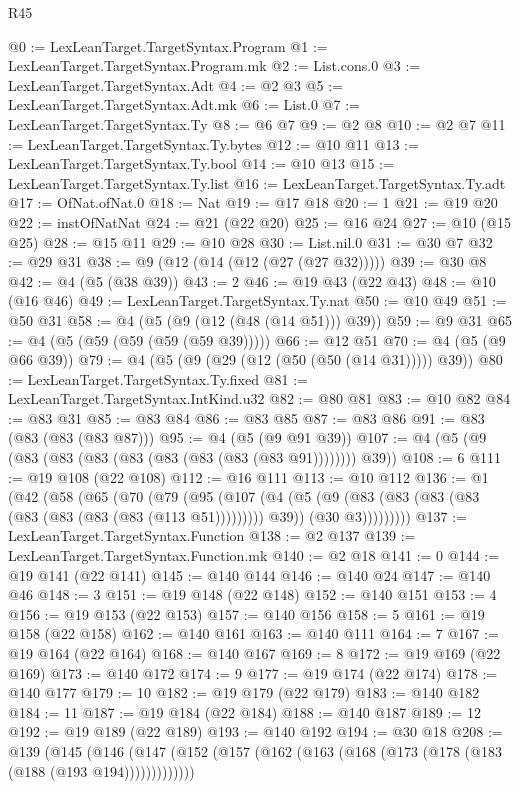 \begin{lexlean}{R45}
\begin{coremodule}
@0 := LexLeanTarget.TargetSyntax.Program
@1 := LexLeanTarget.TargetSyntax.Program.mk
@2 := List.cons.{0}
@3 := LexLeanTarget.TargetSyntax.Adt
@4 := @2 @3
@5 := LexLeanTarget.TargetSyntax.Adt.mk
@6 := List.{0}
@7 := LexLeanTarget.TargetSyntax.Ty
@8 := @6 @7
@9 := @2 @8
@10 := @2 @7
@11 := LexLeanTarget.TargetSyntax.Ty.bytes
@12 := @10 @11
@13 := LexLeanTarget.TargetSyntax.Ty.bool
@14 := @10 @13
@15 := LexLeanTarget.TargetSyntax.Ty.list
@16 := LexLeanTarget.TargetSyntax.Ty.adt
@17 := OfNat.ofNat.{0}
@18 := Nat
@19 := @17 @18
@20 := 1
@21 := @19 @20
@22 := instOfNatNat
@24 := @21 (@22 @20)
@25 := @16 @24
@27 := @10 (@15 @25)
@28 := @15 @11
@29 := @10 @28
@30 := List.nil.{0}
@31 := @30 @7
@32 := @29 @31
@38 := @9 (@12 (@14 (@12 (@27 (@27 @32)))))
@39 := @30 @8
@42 := @4 (@5 (@38 @39))
@43 := 2
@46 := @19 @43 (@22 @43)
@48 := @10 (@16 @46)
@49 := LexLeanTarget.TargetSyntax.Ty.nat
@50 := @10 @49
@51 := @50 @31
@58 := @4 (@5 (@9 (@12 (@48 (@14 @51))) @39))
@59 := @9 @31
@65 := @4 (@5 (@59 (@59 (@59 (@59 @39)))))
@66 := @12 @51
@70 := @4 (@5 (@9 @66 @39))
@79 := @4 (@5 (@9 (@29 (@12 (@50 (@50 (@14 @31))))) @39))
@80 := LexLeanTarget.TargetSyntax.Ty.fixed
@81 := LexLeanTarget.TargetSyntax.IntKind.u32
@82 := @80 @81
@83 := @10 @82
@84 := @83 @31
@85 := @83 @84
@86 := @83 @85
@87 := @83 @86
@91 := @83 (@83 (@83 (@83 @87)))
@95 := @4 (@5 (@9 @91 @39))
@107 := @4 (@5 (@9 (@83 (@83 (@83 (@83 (@83 (@83 (@83 (@83 @91)))))))) @39))
@108 := 6
@111 := @19 @108 (@22 @108)
@112 := @16 @111
@113 := @10 @112
@136 := @1
    (@42
      (@58
        (@65
          (@70
            (@79
              (@95
                (@107
                  (@4
                    (@5 (@9 (@83 (@83 (@83 (@83 (@83 (@83 (@83 (@83 (@113 @51))))))))) @39))
                    (@30 @3)))))))))
@137 := LexLeanTarget.TargetSyntax.Function
@138 := @2 @137
@139 := LexLeanTarget.TargetSyntax.Function.mk
@140 := @2 @18
@141 := 0
@144 := @19 @141 (@22 @141)
@145 := @140 @144
@146 := @140 @24
@147 := @140 @46
@148 := 3
@151 := @19 @148 (@22 @148)
@152 := @140 @151
@153 := 4
@156 := @19 @153 (@22 @153)
@157 := @140 @156
@158 := 5
@161 := @19 @158 (@22 @158)
@162 := @140 @161
@163 := @140 @111
@164 := 7
@167 := @19 @164 (@22 @164)
@168 := @140 @167
@169 := 8
@172 := @19 @169 (@22 @169)
@173 := @140 @172
@174 := 9
@177 := @19 @174 (@22 @174)
@178 := @140 @177
@179 := 10
@182 := @19 @179 (@22 @179)
@183 := @140 @182
@184 := 11
@187 := @19 @184 (@22 @184)
@188 := @140 @187
@189 := 12
@192 := @19 @189 (@22 @189)
@193 := @140 @192
@194 := @30 @18
@208 := @139
    (@145 (@146 (@147 (@152 (@157 (@162 (@163 (@168 (@173 (@178 (@183 (@188 (@193 @194)))))))))))))

\end{coremodule}
\end{lexlean}
